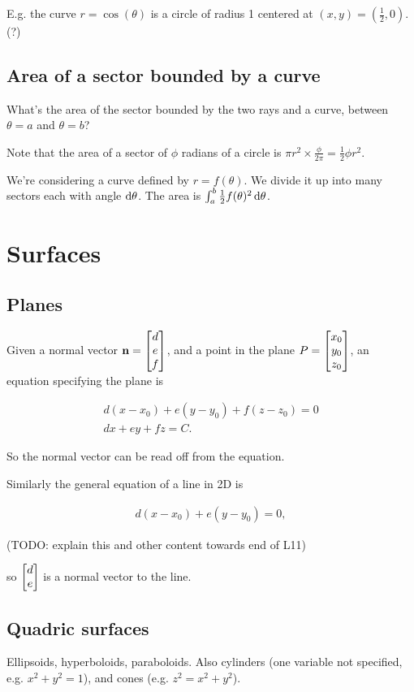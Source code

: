 \documentclass[12pt]{article}
\begin{document}
E.g. the curve $r = \cos(\theta)$ is a circle of radius 1 centered at $(x, y) = (\frac{1}{2}, 0)$. (?)

\subsection*{Area of a sector bounded by a curve}

What's the area of the sector bounded by the two rays and a curve, between $\theta=a$ and $\theta=b$?

Note that the area of a sector of $\phi$ radians of a circle is $\pi r^2 \times \frac{\phi}{2\pi} = \frac{1}{2}\phi r^2$.

We're considering a curve defined by $r = f(\theta)$. We divide it up into many
sectors each with angle $\operatorname{\text{d}\theta}$. The area is
$\int_a^b \frac{1}{2}f(\theta)^2\operatorname{\text{d}\theta}$.

\section{Surfaces}

\subsection*{Planes}
Given a normal vector $\mathbf{n} = \begin{bmatrix}d\\e\\f\end{bmatrix}$, and a point in the plane
$P = \begin{bmatrix}x_0\\y_0\\z_0\end{bmatrix}$, an equation specifying the plane is

\begin{align*}
  d(x - x_0) + e(y - y_0) + f(z - z_0) = 0 \\
  dx + ey + fz = C.
\end{align*}

So the normal vector can be read off from the equation.

Similarly the general equation of a line in 2D is

\begin{align*}
  d(x - x_0) + e(y - y_0) = 0,
\end{align*}

(TODO: explain this and other content towards end of L11)

so $\begin{bmatrix}d\\e\end{bmatrix}$ is a normal vector to the line.


\subsection*{Quadric surfaces}
Ellipsoids, hyperboloids, paraboloids. Also cylinders (one variable not
specified, e.g. $x^2 + y^2 = 1$), and cones (e.g. $z^2 = x^2 + y^2$).
\end{document}
